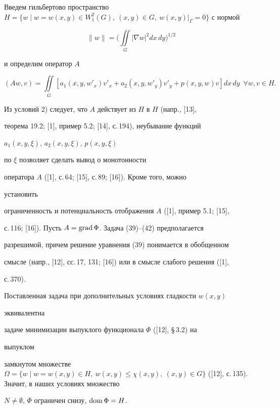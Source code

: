 Введем гильбертово пространство $H=\{w\mid w=w(x,y)\in


W^2_1(G),\ (x,y)\in G,\ w(x,y)|_{\Gamma } =0\}$ с нормой


\begin{equation}\label {43}


\|w\|= \bigg(\iint\limits_G| \nabla w|^2 dx\,dy \bigg)^{1/2}


\end{equation}


и определим оператор $A$


\begin{equation}\label {44}


(Aw,v)=\iint\limits_G [a_1(x,y,w'_x)v'_x+a_2(x,y,w'_y)v'_y


+p(x,y,w)v ]dx\,dy\ \;\forall w,v \in H.


\end{equation}


Из условий 2) следует, что $A$ действует из $H$ в $H$ (напр., [13],


теорема 19.2; [1], пример 5.2; [14], с.\,194), неубывание функций


$a_1(x,y,\xi)$, $a_2(x,y,\xi )$, $p(x,y,\xi )$


по $\xi$ позволяет сделать вывод о монотонности


оператора $A$ ([1], с.\,64; [15], с.\,89; [16]). Кроме того, можно


установить


ограниченность и потенциальность отображения $A$ ([1], пример 5.1; [15],


с.\,116; [16]). Пусть $A=\operatorname{grad} \Phi $. Задача (39)--(42) предполагается


разрешимой, причем решение уравнения (39) понимается в обобщенном


смысле (напр., [12], сс.\,17, 131; [16]) или в смысле слабого решения ([1],


с.\,370).


Поставленная задача при дополнительных условиях гладкости $w(x,y)$


эквивалентна


задаче минимизации выпуклого функционала $\Phi$ ([12], \S\,3.2) на


выпуклом


замкнутом множестве $\Omega =\{w\mid w=w(x,y) \in H,\ w(x,y) \leq \chi


(x,y),\ (x,y) \in G\}$ ([12], с.\,135). Значит, в наших условиях множество


$N\ne\emptyset$, $\Phi$ ограничен снизу, $\operatorname{dom}\Phi=H$.


